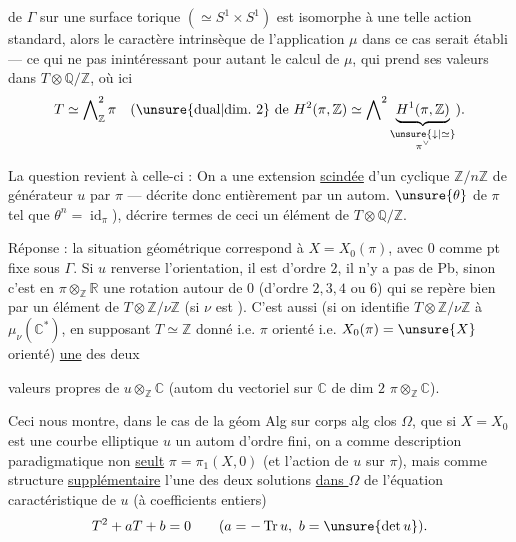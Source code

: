 

de \(\Gamma\) sur une surface torique \((\simeq S^1\times S^1)\)
est isomorphe à une telle action standard, alors le caractère
intrinsèque de l'application \(\mu\) dans ce cas serait établi
--- ce qui ne  pas inintéressant pour autant le calcul
de \(\mu\), qui prend ses valeurs dans
\(T\otimes\mathbb Q/\mathbb Z\), où ici
\[
T\simeq\bigwedge\nolimits_{\mathbb Z}^{2}\pi
\quad
(\text{\unsure{dual|dim.\ 2} de }H^2(\pi,\mathbb Z)\simeq
\bigwedge\nolimits^{2}
\underbrace{H^1(\pi,\mathbb Z)}_{
\substack{\unsure{\downarrow|\simeq}\\ \pi^\vee}}).
\]

La question revient à celle-ci : On a une extension \uline{scindée}
d'un  cyclique
\(\mathbb Z/n\mathbb Z\) de générateur \(u\) par \(\pi\)
--- décrite donc entièrement par un autom.
 \(\unsure{\theta}\) de \(\pi\) tel que
\(\theta^n=\operatorname{id}_\pi\)), décrire  termes de
ceci un élément de \(T\otimes\mathbb Q/\mathbb Z\).

Réponse : la situation géométrique 
correspond à \(X=X_0(\pi)\), avec \(0\) comme pt fixe sous \(\Gamma\).
Si \(u\) renverse l'orientation, il est d'ordre  \(2\),
il n'y a pas de Pb, sinon c'est  en
\(\pi\otimes_{\mathbb Z}\mathbb R\) une rotation autour de \(0\)
(d'ordre \(2,3,4\) ou \(6\)) qui se repère bien par un élément
de  \(T\otimes\mathbb Z/\nu\mathbb Z\)
(si \(\nu\) est ).
C'est aussi (si on identifie
\(T\otimes\mathbb Z/\nu\mathbb Z\) à
\(\mu_\nu(\mathbb C^*)\), en supposant
\(T\simeq\mathbb Z\) donné
i.e. \(\pi\) orienté i.e. \(X_0(\pi)=\unsure{X}\)
orienté) \uline{une} des deux



valeurs propres de \(u\otimes_{\mathbb Z}\mathbb C\)
(autom du vectoriel sur \(\mathbb C\) de dim \(2\)
\(\pi\otimes_{\mathbb Z}\mathbb C\)).

Ceci nous montre, dans le cas de la géom Alg sur corps alg clos
\(\Omega\), que si \(X=X_0\) est une courbe elliptique
\(u\) un autom d'ordre fini, on a comme description
paradigmatique non \uline{seult}
\(\pi=\pi_1(X,0)\)
(et l'action de \(u\) sur \(\pi\)), mais comme structure
\uline{supplémentaire} l'une des deux solutions \uline{dans \(\Omega\)}
de l'équation caractéristique de \(u\) (à coefficients entiers)
\[
T^2+aT+b=0
\qquad (a=-\operatorname{Tr}u,\ b=\unsure{\det u}).
\]

